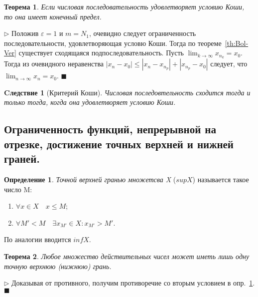 \documentclass{urticle}
\newtheorem{theorem}{Теорема}
\newtheorem{consectary}{Cледствие}
\theoremstyle{definition}
\newtheorem{definition}{Определение}
\newcommand{\prf}[1]{\hspace{0.3cm}$\triangleright$ \hspace{0.2cm} {#1} \hfill $\blacksquare$ }
\begin{document}
    \begin{theorem}
    \label{th:IfKoshi}
        Если числовая последовательность удовлетворяет условию Коши, то она имеет конечный предел.
    \end{theorem}
    \prf{Положив $\varepsilon = 1$ и $m = N_1$, очевидно следует ограниченность последовательности, удовлетворяющая условю Коши. Тогда по теореме~\ref{th:Bol-Ver} существует сходящаяся подпоследовательность. Пусть $\displaystyle \lim_{k\to\infty}x_{n_k} = x_0$. Тогда из очевидного неравенства $|x_n - x_0| \leq |x_n - x_{n_p}| + |x_{n_p} - x_0|$ следует, что $\displaystyle \lim_{n\to\infty}x_n = x_0$.}
    
    \begin{consectary}[Критерий Коши]
    \label{th:KrKoshi}
        Числовая последовтельность сходится тогда и только тогда, когда она удовлетворяет условию Коши.
    \end{consectary}

\subsection{Ограниченность функций, непрерывной на отрезке, достижение точных верхней и нижней граней.}

    \begin{definition}    
    \label{def:SupInf}
        \textit{Точной верхней гранью множетсва X} ($supX$) называется такое число M:
        \begin{enumerate}
        \item $\forall x \in X \quad x \leq M$;
        \item $\forall M' < M \quad \exists x_{M'} \in X: x_{M'} > M'$.
        \end{enumerate}
        По аналогии вводится $infX$.
    \end{definition}
    
    \begin{theorem}
    \label{th:OnlySupInf}
        Любое множество действительных чисел может иметь лишь одну точную верхнюю (нижнюю) грань.
    \end{theorem}
    \prf{Доказывая от противного, получим противоречие со вторым условием в опр.~\ref{def:SupInf}.}
    
\end{document}
